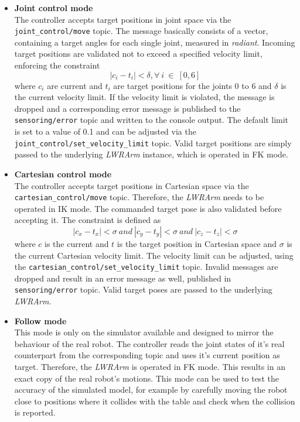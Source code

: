 \begin{itemize}

\item \textbf{Joint control mode} \\
The controller accepts target positions in joint space via the \texttt{joint\_control/move} topic. The message basically consists of a vector, containing a target angles for each single joint, measured in \emph{radiant}. Incoming target positions are validated not to exceed a specified velocity limit, enforcing the constraint
\begin{equation}
  |c_{i}-t_{i}|<\delta, \forall ~i~\in~[0,6]
\end{equation}
where $c_{i}$ are current and $t_{i}$ are target positions for the joints 0 to 6 and $\delta$ is the current velocity limit. If the velocity limit is violated, the message is dropped and a corresponding error message is published to the \texttt{sensoring/error} topic and written to the console output. The default limit is set to a value of 0.1 and can be adjusted via the \texttt{joint\_control/set\_velocity\_limit} topic. Valid target positions are simply passed to the underlying \emph{LWRArm} instance, which is operated in FK mode.

\item \textbf{Cartesian control mode} \\
The controller accepts target positions in Cartesian space via the \texttt{cartesian\_control/move} topic. Therefore, the \emph{LWRArm} needs to be operated in IK mode. The commanded target pose is also validated before accepting it. The constraint is defined as
\begin{equation}
  |c_{x}-t_{x}|<\sigma ~and~ |c_{y}-t_{y}|<\sigma ~and~ |c_{z}-t_{z}|<\sigma
\end{equation}
where $c$ is the current and $t$ is the target position in Cartesian space and $\sigma$ is the current Cartesian velocity limit. The velocity limit can be adjusted, using the \texttt{cartesian\_control/set\_velocity\_limit} topic. Invalid messages are dropped and result in an error message as well, published in \texttt{sensoring/error} topic. Valid target poses are passed to the underlying \emph{LWRArm}.

\item \textbf{Follow mode} \\
This mode is only on the simulator available and designed to mirror the behaviour of the real robot. The controller reads the joint states of it's real counterpart from the corresponding topic and uses it's current position as target. Therefore, the \emph{LWRArm} is operated in FK mode. This results in an exact copy of the real robot's motions. This mode can be used to test the accuracy of the simulated model, for example by carefully moving the robot close to positions where it collides with the table and check when the collision is reported. 

\end{itemize}

